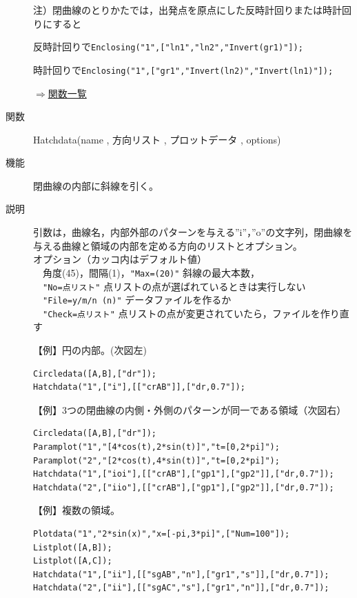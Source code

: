 \documentclass[papersize,a4paper,12pt,uplatex]{jsarticle}
\begin{document}
\begin{description}
\vspace{\baselineskip}
注）閉曲線のとりかたでは，出発点を原点にした反時計回りまたは時計回りにすると

反時計回りで\verb|Enclosing("1",["ln1","ln2","Invert(gr1)"]);|

時計回りで\verb|Enclosing("1",["gr1","Invert(ln2)","Invert(ln1)"]);|

\begin{flushright}\hyperlink{functionlist}{$\Rightarrow$関数一覧}\end{flushright}

\vspace{\baselineskip}
\hypertarget{hatchdata}{}
\item[関数]Hatchdata(name , 方向リスト , プロットデータ , options)
\item[機能]閉曲線の内部に斜線を引く。
\item[説明]引数は，曲線名，内部外部のパターンを与える''i''，''o''の文字列，閉曲線を与える曲線と領域の内部を定める方向のリストとオプション。\\
オプション（カッコ内はデフォルト値）\\
　角度(45)，間隔(1)，\verb|"Max=(20)"| 斜線の最大本数，\\
　\verb|"No=点リスト"| 点リストの点が選ばれているときは実行しない\\
　\verb|"File=y/m/n (n)"| データファイルを作るか\\
　\verb|"Check=点リスト"| 点リストの点が変更されていたら，ファイルを作り直す
 
\vspace{\baselineskip}
【例】円の内部。(次図左)
\begin{verbatim}
Circledata([A,B],["dr"]);
Hatchdata("1",["i"],[["crAB"]],["dr,0.7"]);
\end{verbatim}

【例】3つの閉曲線の内側・外側のパターンが同一である領域（次図右）
\begin{verbatim}
Circledata([A,B],["dr"]);
Paramplot("1","[4*cos(t),2*sin(t)]","t=[0,2*pi]");
Paramplot("2","[2*cos(t),4*sin(t)]","t=[0,2*pi]");
Hatchdata("1",["ioi"],[["crAB"],["gp1"],["gp2"]],["dr,0.7"]);
Hatchdata("2",["iio"],[["crAB"],["gp1"],["gp2"]],["dr,0.7"]);
\end{verbatim}
\vspace{\baselineskip}
\hspace{5mm}  \hspace{5mm}  

【例】複数の領域。
\begin{verbatim}
Plotdata("1","2*sin(x)","x=[-pi,3*pi]",["Num=100"]);
Listplot([A,B]);
Listplot([A,C]);
Hatchdata("1",["ii"],[["sgAB","n"],["gr1","s"]],["dr,0.7"]);
Hatchdata("2",["ii"],[["sgAC","s"],["gr1","n"]],["dr,0.7"]);
\end{verbatim}
\begin{center}
\begin{center}  \end{center}
\end{center}


\end{description}
\end{document}
